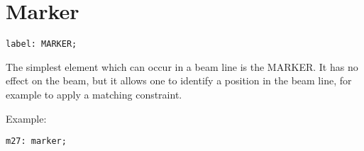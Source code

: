 
\section{Marker}

\begin{verbatim}
label: MARKER;
\end{verbatim} 
The simplest element which can occur in a beam line is the MARKER. It
has no effect on the beam, but it allows one to identify a position in
the beam line, for example to apply a matching constraint.  

Example: 
\begin{verbatim}
m27: marker;
\end{verbatim}

